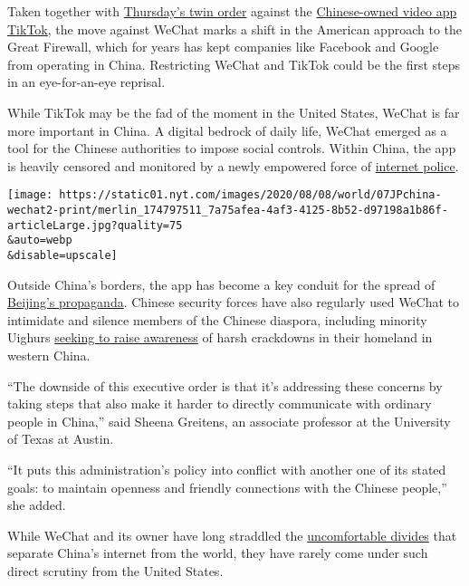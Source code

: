 Taken together with
\href{https://www.whitehouse.gov/presidential-actions/executive-order-addressing-threat-posed-tiktok/}{Thursday's
twin order} against the
\href{https://www.nytimes.com/2020/08/03/technology/tiktok-bytedance-us-china.html}{Chinese-owned
video app TikTok}, the move against WeChat marks a shift in the American
approach to the Great Firewall, which for years has kept companies like
Facebook and Google from operating in China. Restricting WeChat and
TikTok could be the first steps in an eye-for-an-eye reprisal.

While TikTok may be the fad of the moment in the United States, WeChat
is far more important in China. A digital bedrock of daily life, WeChat
emerged as a tool for the Chinese authorities to impose social controls.
Within China, the app is heavily censored and monitored by a newly
empowered force of
\href{https://www.nytimes.com/2020/03/16/business/china-coronavirus-internet-police.html}{internet
police}.

\texttt{[image: https://static01.nyt.com/images/2020/08/08/world/07JPchina-wechat2-print/merlin\_174797511\_7a75afea-4af3-4125-8b52-d97198a1b86f-articleLarge.jpg?quality=75\\\&auto=webp\\\&disable=upscale]}

Outside China's borders, the app has become a key conduit for the spread
of
\href{https://www.nytimes.com/2018/03/02/technology/china-technology-censorship-borders-expansion.html}{Beijing's
propaganda}. Chinese security forces have also regularly used WeChat to
intimidate and silence members of the Chinese diaspora, including
minority Uighurs
\href{https://www.nytimes.com/2019/08/15/podcasts/the-daily/china-xinjiang-uighur-detention.html}{seeking
to raise awareness} of harsh crackdowns in their homeland in western
China.

``The downside of this executive order is that it's addressing these
concerns by taking steps that also make it harder to directly
communicate with ordinary people in China,'' said Sheena Greitens, an
associate professor at the University of Texas at Austin.

``It puts this administration's policy into conflict with another one of
its stated goals: to maintain openness and friendly connections with the
Chinese people,'' she added.

While WeChat and its owner have long straddled the
\href{https://www.nytimes.com/2017/09/17/technology/facebook-government-regulations.html}{uncomfortable
divides} that separate China's internet from the world, they have rarely
come under such direct scrutiny from the United States.

